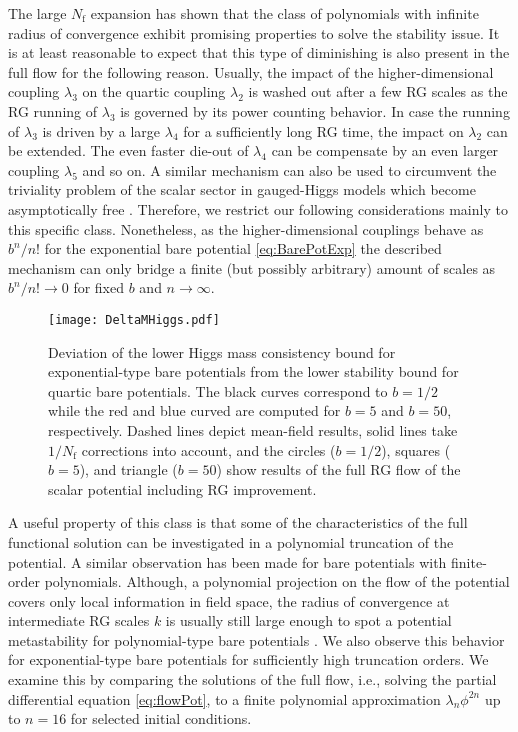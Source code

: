 \documentclass[twocolumn,aps,prd,showpacs,nofootinbib,superscriptaddress,preprintnumbers,floatfix,10pt]{revtex4-1}
\newcommand{\Nf}{N_{\mathrm{f}}}
\begin{document}
The large $\Nf$ expansion has shown that the class of polynomials with infinite radius of convergence exhibit promising properties to solve the stability issue. 
It is at least reasonable to expect that this type of diminishing is also present in the full flow for the following reason. 
Usually, the impact of the higher-dimensional coupling $\lambda_{3}$ on the quartic coupling $\lambda_{2}$ is washed out after a few RG scales as the RG running of $\lambda_{3}$ is governed by its power counting behavior. In case the running of $\lambda_{3}$ is driven by a large $\lambda_{4}$ for a sufficiently long RG time, the impact on $\lambda_{2}$ can be extended. The even faster die-out of $\lambda_{4}$ can be compensate by an even larger coupling $\lambda_{5}$ and so on. 
A similar mechanism can also be used to circumvent the triviality problem of the scalar sector in gauged-Higgs models which become asymptotically free \cite{Gies:2016kkk}.
Therefore, we restrict our following considerations mainly to this specific class. Nonetheless, as the higher-dimensional couplings behave as $b^{n}/n!$ for the exponential bare potential \eqref{eq:BarePotExp} the described mechanism can only bridge a finite (but possibly arbitrary) amount of scales as $b^{n}/n! \to 0$ for fixed $b$ and $n \to \infty$. 



\begin{figure}[t!]
\centering
\texttt{[image: DeltaMHiggs.pdf]}
\caption{Deviation of the lower Higgs mass consistency bound for exponential-type bare potentials from the lower stability bound for quartic bare potentials. The black curves correspond to $b=1/2$ while the red and blue curved are computed for $b=5$ and $b=50$, respectively. Dashed lines depict mean-field results, solid lines take $1/\Nf$ corrections into account, and the circles ($b=1/2$), squares ($b=5$), and triangle ($b=50$) show results of the full RG flow of the scalar potential including RG improvement.}
\label{fig:Comparison}
\end{figure}


A useful property of this class is that some of the characteristics of the full functional solution can be investigated in a polynomial truncation of the potential. 
A similar observation has been made for bare potentials with finite-order polynomials. Although, a polynomial projection on the flow of the potential covers only local information in field space, the radius of convergence at intermediate RG scales $k$ is usually still large enough to spot a potential metastability for polynomial-type bare potentials \cite{Borchardt:2016xju}. We also observe this behavior for exponential-type bare potentials for sufficiently high truncation orders. We examine this by comparing the solutions of the full flow, i.e., solving the partial differential equation \eqref{eq:flowPot}, to a finite polynomial approximation $\lambda_{n}\phi^{2n}$ up to $n=16$ for selected initial conditions. 
\end{document}
